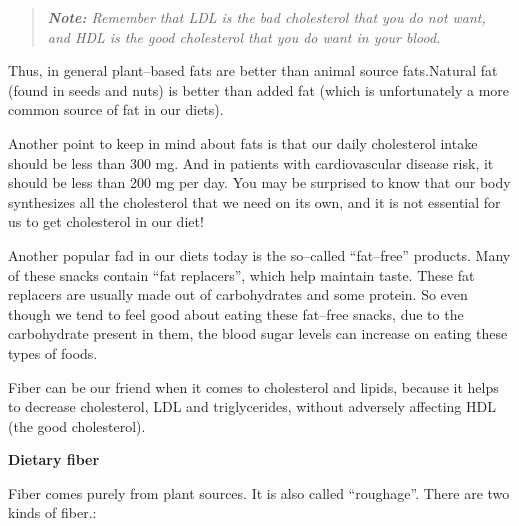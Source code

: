 \begin{quote}
\textit{\textbf{Note:} Remember that LDL is the bad cholesterol that you do not want, and HDL is the good cholesterol that you do want in your blood.}
\end{quote}

Thus, in general plant–based fats are better than animal source fats.\break Natural fat (found in seeds and nuts) is better than added fat (which is unfortunately a more common source of fat in our diets).

Another point to keep in mind about fats is that our daily chole\-sterol intake should be less than 300 mg. And in patients with cardiovascular disease risk, it should be less than 200 mg per day. You may be surprised to know that our body synthesizes all the cholesterol that we need on its own, and it is not essential for us to get cholesterol in our diet!

Another popular fad in our diets today is the so–called “fat–free” products. Many of these snacks contain “fat replacers”, which help maintain taste. These fat replacers are usually made out of carbohydrates and some protein. So even though we tend to feel good about eating these fat–free snacks, due to the carbohydrate present in them, the blood sugar levels can increase on eating these types of foods.

Fiber can be our friend when it comes to cholesterol and lipids, because it helps to decrease cholesterol, LDL and triglycerides, without adversely affecting HDL (the good cholesterol).

\noindent\textbf{Dietary fiber}

Fiber comes purely from plant sources. It is also called “roughage”. There are two kinds of fiber.:

